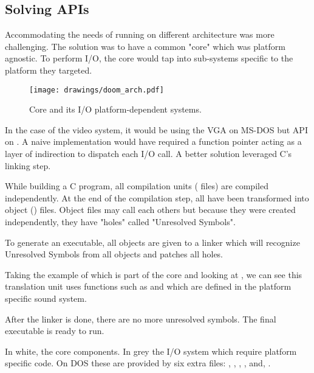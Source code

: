 \subsection{Solving APIs}
Accommodating the needs of running on different architecture was more challenging. The solution was to have a common "core" which was platform agnostic. To perform I/O, the core would tap into sub-systems specific to the platform they targeted.\\
\par
\begin{figure}[H]
\centering
\texttt{[image: drawings/doom\_arch.pdf]}
\caption{\doom Core and its I/O platform-dependent systems.}
\end{figure}
\par
In the case of the video system, it would be using the VGA on MS-DOS but  API on \NeXT. A naive implementation would have required a function pointer acting as a layer of indirection to dispatch each I/O call. A better solution leveraged C's linking step.\\
\par
 While building a C program, all compilation units ( files) are compiled independently. At the end of the compilation step, all  have been transformed into object () files. Object files may call each others but because they were created independently, they have "holes" called "Unresolved Symbols".\\
\par
 To generate an executable, all objects are given to a linker which will recognize Unresolved Symbols from all objects and patches all holes.\\
 \par
 Taking the example of  which is part of the core and looking at , we can see this translation unit uses functions such as  and  which are defined in the platform specific sound system. \\
\par
{}
\par
After the linker is done, there are no more unresolved symbols. The final executable is ready to run.\\
\par
{}




\pagebreak
{}
\par
In white, the core components. In grey the I/O system which require platform specific code. On DOS these are provided by six extra files: , , , ,  and, .\\







